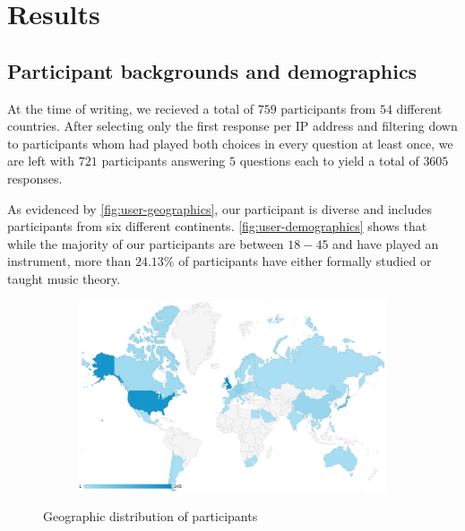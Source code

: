 \section{Results}\label{sec:eval-results}

\subsection{Participant backgrounds and demographics}

At the time of writing, we recieved a total of $759$ participants from $54$
different countries. After selecting only the first response per IP address and
filtering down to participants whom had played both choices in every question
at least once, we are left with $721$ participants answering $5$ questions each
to yield a total of $3605$ responses.

As evidenced by \vref{fig:user-geographics}, our participant is diverse and
includes participants from six different continents.
\vref{fig:user-demographics} shows that while the majority of our participants
are between $18-45$ and have played an instrument, more than
$24.13\%$ of participants have either formally studied or taught music theory.

\begin{figure}[p]
  \centering
  \begin{subfigure}[b]{0.98\textwidth}
    \centering
    \includegraphics[width=0.85\linewidth]{participants-by-country.png}
  \end{subfigure}
  \begin{subfigure}[c]{0.55\textwidth}
    \centering
    
  \end{subfigure}
  \begin{subfigure}[c]{0.44\textwidth}
    \centering
    
  \end{subfigure}
  \caption{Geographic distribution of participants}
  \label{fig:user-geographics}
\end{figure}

